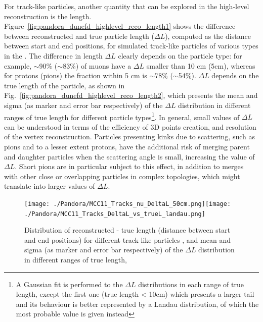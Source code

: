 For track-like particles, another quantity that can be explored in the high-level reconstruction is the length. Figure~\ref{fig:pandora_dunefd_highlevel_reco_length1} shows the difference between reconstructed and true particle length ($\Delta L$), computed as the \threed distance between start and end positions, for simulated track-like particles of various types in the . The difference in length $\Delta L$ clearly depends on the particle type: for example, $\sim$90\% ($\sim$83\%) of muons have a $\Delta L$ smaller than 10 cm (5cm), whereas for protons (pions) the fraction within 5 cm is $\sim$78\% ($\sim$54\%). $\Delta L$ depends on the true length of the particle, as shown in Fig.~\ref{fig:pandora_dunefd_highlevel_reco_length2}, which presents the mean and sigma (as marker and error bar respectively) of the $\Delta L$ distribution in different ranges of true length for different particle types\footnote{A Gaussian fit is performed to the $\Delta L$ distributions in each range of true length, except the first one (true length < 10cm) which presents a larger tail and its behaviour is better represented by a Landau distribution, of which the most probable value is given instead}. In general, small values of $\Delta L$ can be understood in terms of the efficiency of 3D points creation, and resolution of the vertex reconstruction. Particles presenting kinks due to scattering, such as pions and to a lesser extent protons, have the additional risk of merging parent and daughter particles when the scattering angle is small, increasing the value of $\Delta L$. Short pions are in particular subject to this effect, in addition to merges with other close or overlapping particles in complex topologies, which might translate into larger values of $\Delta L$. 

\begin{figure}[!ht]
\centering
\subfloat[]{\label{fig:pandora_dunefd_highlevel_reco_length1}}\texttt{[image: ./Pandora/MCC11\_Tracks\_nu\_DeltaL\_50cm.png]}\subfloat[]{\label{fig:pandora_dunefd_highlevel_reco_length2}}\texttt{[image: ./Pandora/MCC11\_Tracks\_DeltaL\_vs\_trueL\_landau.png]}
\caption[Distribution of reconstructed-true length for different track-like particles]{Distribution of reconstructed - true length (\threed distance between start and end positions) for different track-like particles \protect{}, and mean and sigma (as marker and error bar respectively) of the $\Delta L$ distribution in different ranges of true length\protect{},}
\label{fig:pandora_dunefd_highlevel_reco_length}
\end{figure}

